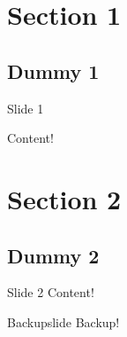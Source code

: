

\togglefalse{logo} %
\togglefalse{section-slides} %

\renewcommand{\Title}{Example Template}
\renewcommand{\SubTitle}{for \LaTeX~ Beamer}
\renewcommand{\Author}{Yannick Forster}
\renewcommand{\CoAuthor}{}
\renewcommand{\Institute}{{\scshape Saarland University}}
\date{}






\showtitlepage %

\begin{frame}
  \tableofcontents
\end{frame}

\section{Section 1}

\subsection{Dummy 1} %

\begin{frame}{Slide 1}

  Content!

\end{frame}

\section{Section 2}

\subsection{Dummy 2}

\begin{frame}{Slide 2}
  Content!
\end{frame}

\appendix %

\backupbegin %

\begin{frame}{Backupslide}
  Backup!
\end{frame}

\backupend



